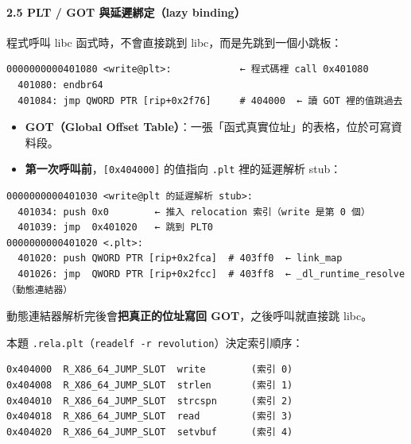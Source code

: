 \documentclass[10pt,a4paper]{article}
\providecommand{\tightlist}{%
  \setlength{\itemsep}{0pt}\setlength{\parskip}{0pt}}
\begin{document}
\paragraph{2.5 PLT / GOT 與延遲綁定（lazy
binding）}\label{plt-got-ux8207ux5ef6ux9072ux7d81ux5b9alazy-binding}

程式呼叫 libc 函式時，不會直接跳到 libc，而是先跳到一個小跳板：

\begin{Verbatim}[breaklines=true,breakanywhere=true,breakautoindent=false,fontsize=\fontsize{7.0}{9.5}\selectfont]
0000000000401080 <write@plt>:            ← 程式碼裡 call 0x401080
  401080: endbr64
  401084: jmp QWORD PTR [rip+0x2f76]     # 404000  ← 讀 GOT 裡的值跳過去
\end{Verbatim}

\begin{itemize}
\tightlist
\item
  \textbf{GOT（Global Offset
  Table）}：一張「函式真實位址」的表格，位於可寫資料段。
\item
  \textbf{第一次呼叫前}，\texttt{{[}0x404000{]}} 的值指向 \texttt{.\allowbreak{}plt}
  裡的延遲解析 stub：
\end{itemize}

\begin{Verbatim}[breaklines=true,breakanywhere=true,breakautoindent=false,fontsize=\fontsize{7.0}{9.5}\selectfont]
0000000000401030 <write@plt 的延遲解析 stub>:
  401034: push 0x0        ← 推入 relocation 索引（write 是第 0 個）
  401039: jmp  0x401020   ← 跳到 PLT0
0000000000401020 <.plt>:
  401020: push QWORD PTR [rip+0x2fca]  # 403ff0  ← link_map
  401026: jmp  QWORD PTR [rip+0x2fcc]  # 403ff8  ← _dl_runtime_resolve（動態連結器）
\end{Verbatim}

動態連結器解析完後會\textbf{把真正的位址寫回 GOT}，之後呼叫就直接跳
libc。

本題
\texttt{.\allowbreak{}rela.\allowbreak{}plt}（\texttt{readelf\ \allowbreak{}-\allowbreak{}r\ \allowbreak{}revolution}）決定索引順序：

\begin{Verbatim}[breaklines=true,breakanywhere=true,breakautoindent=false,fontsize=\fontsize{7.0}{9.5}\selectfont]
0x404000  R_X86_64_JUMP_SLOT  write        (索引 0)
0x404008  R_X86_64_JUMP_SLOT  strlen       (索引 1)
0x404010  R_X86_64_JUMP_SLOT  strcspn      (索引 2)
0x404018  R_X86_64_JUMP_SLOT  read         (索引 3)
0x404020  R_X86_64_JUMP_SLOT  setvbuf      (索引 4)
\end{Verbatim}
\end{document}
